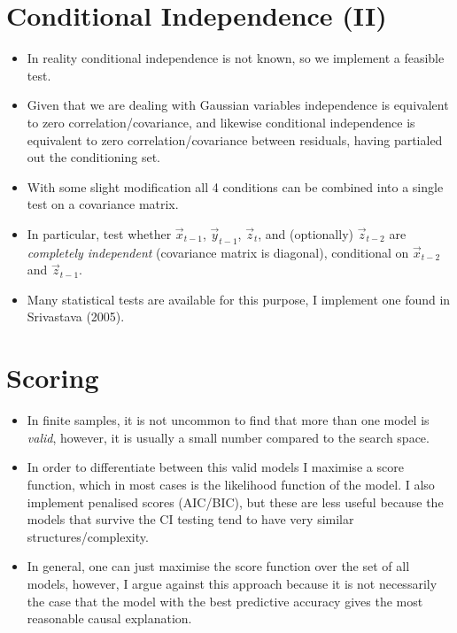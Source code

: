 \documentclass{article}
\begin{document}
\section*{Conditional Independence (II)}
\begin{itemize}
    \item In reality conditional independence is not known, so we implement a feasible test.
    \item Given that we are dealing with Gaussian variables independence is equivalent to zero correlation/covariance, and likewise conditional independence is equivalent to zero correlation/covariance between residuals, having partialed out the conditioning set.
    \item With some slight modification all 4 conditions can be combined into a single test on a covariance matrix.
    \item In particular, test whether $\vec{x}_{t-1}$, $\vec{y}_{t-1}$, $\vec{z}_{t}$, and (optionally) $\vec{z}_{t-2}$ are \textit{completely independent} (covariance matrix is diagonal), conditional on $\vec{x}_{t-2}$ and $\vec{z}_{t-1}$.
    \item Many statistical tests are available for this purpose, I implement one found in Srivastava (2005).
\end{itemize}

\section*{Scoring}
\begin{itemize}
    \item In finite samples, it is not uncommon to find that more than one model is \textit{valid}, however, it is usually a small number compared to the search space.
    \item In order to differentiate between this valid models I maximise a score function, which in most cases is the likelihood function of the model. I also implement penalised scores (AIC/BIC), but these are less useful because the models that survive the CI testing tend to have very similar structures/complexity.
    \item In general, one can just maximise the score function over the set of all models, however, I argue against this approach because it is not necessarily the case that the model with the best predictive accuracy gives the most reasonable causal explanation.
\end{itemize}
\end{document}
